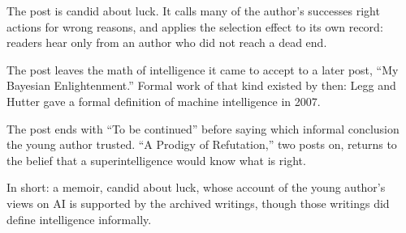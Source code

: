 \begin{afterword}
The post is candid about luck. It calls many of the author's successes right actions for wrong reasons, and applies the selection effect to its own record: readers hear only from an author who did not reach a dead end.

The post leaves the math of intelligence it came to accept to a later post, ``My Bayesian Enlightenment.'' Formal work of that kind existed by then: Legg and Hutter gave a formal definition of machine intelligence in 2007.

The post ends with ``To be continued'' before saying which informal conclusion the young author trusted. ``A Prodigy of Refutation,'' two posts on, returns to the belief that a superintelligence would know what is right.

In short: a memoir, candid about luck, whose account of the young author's views on AI is supported by the archived writings, though those writings did define intelligence informally.
\end{afterword}
